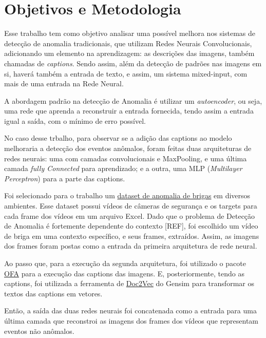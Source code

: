 
\section{Objetivos e Metodologia}

Esse trabalho tem como objetivo analisar uma possível melhora nos sistemas de detecção de anomalia tradicionais, que utilizam Redes Neurais Convolucionais, adicionando um elemento na aprendizagem: as descrições das imagens, também chamadas de \textit{captions}. Sendo assim, além da detecção de padrões nas imagens em si, haverá também a entrada de texto, e assim, um sistema mixed-input, com mais de uma entrada na Rede Neural. 

A abordagem padrão na detecção de Anomalia é utilizar um \textit{autoencoder}, ou seja, uma rede que aprenda a reconstruir a entrada fornecida, tendo assim a entrada igual a saída, com o mínimo de erro possível.

No caso desse trbalho, para observar se a adição das captions ao modelo melhoraria a detecção dos eventos anômalos, foram feitas duas arquiteturas de redes neurais: uma com camadas convolucionais e MaxPooling, e uma última camada \textit{fully Connected} para aprendizado; e a outra, uma MLP (\textit{Multilayer Perceptron}) para a parte das captions.

Foi selecionado para o trabalho um \href{https://paperswithcode.com/dataset/ubi-fights}{dataset de anomalia de brigas} em diversos ambientes. Esse dataset possui vídeos de câmeras de segurança e os targets para cada frame dos vídeos em um arquivo Excel. Dado que o problema de Detecção de Anomalia é fortemente dependente do contexto [REF], foi escolhido um vídeo de briga em uma contexto específico, e seus frames, extraídos. Assim, as imagens dos frames foram postas como a entrada da primeira arquitetura de rede neural.

Ao passo que, para a execução da segunda arquitetura, foi utilizado o pacote \href{https://github.com/OFA-Sys/OFA}{OFA} para a execução das captions das imagens. E, posteriormente, tendo as captions, foi utilizada a ferramenta de \href{https://radimrehurek.com/gensim/models/doc2vec.html}{Doc2Vec} do Gensim para transformar os textos das captions em vetores.

Então, a saída das duas redes neurais foi concatenada como a entrada para uma última camada que reconstroi as imagens dos frames dos vídeos que representam eventos não anômalos.

